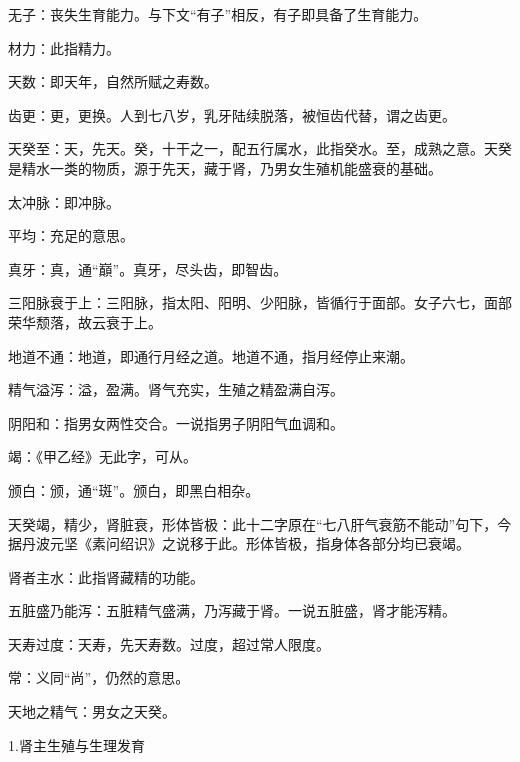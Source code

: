 \documentclass[draft,12pt]{ctexbook}
\begin{document}

\begin{jiaozhu}
  \item 无子：丧失生育能力。与下文“有子”相反，有子即具备了生育能力。
  \item 材力：此指精力。
  \item 天数：即天年，自然所赋之寿数。
  \item 齿更：更，更换。人到七八岁，乳牙陆续脱落，被恒齿代替，谓之齿更。
  \item 天癸至：天，先天。癸，十干之一，配五行属水，此指癸水。至，成熟之意。天癸是精水一类的物质，源于先天，藏于肾，乃男女生殖机能盛衰的基础。
  \item 太冲脉：即冲脉。
  \item 平均：充足的意思。
  \item 真牙：真，通“巔”。真牙，尽头齿，即智齿。
  \item 三阳脉衰于上：三阳脉，指太阳、阳明、少阳脉，皆循行于面部。女子六七，面部荣华颓落，故云衰于上。
  \item 地道不通：地道，即通行月经之道。地道不通，指月经停止来潮。
  \item 精气溢泻：溢，盈满。肾气充实，生殖之精盈满自泻。
  \item 阴阳和：指男女两性交合。一说指男子阴阳气血调和。
  \item 竭：《甲乙经》无此字，可从。
  \item 颁白：颁，通“斑”。颁白，即黑白相杂。
  \item 天癸竭，精少，肾脏衰，形体皆极：此十二字原在“七八肝气衰筋不能动”句下，今据丹波元坚《素问绍识》之说移于此。形体皆极，指身体各部分均已衰竭。
  \item 肾者主水：此指肾藏精的功能。
  \item 五脏盛乃能泻：五脏精气盛满，乃泻藏于肾。一说五脏盛，肾才能泻精。
  \item 天寿过度：天寿，先天寿数。过度，超过常人限度。
  \item 常：义同“尚”，仍然的意思。
  \item 天地之精气：男女之天癸。
\end{jiaozhu}


1.肾主生殖与生理发育
\end{document}
